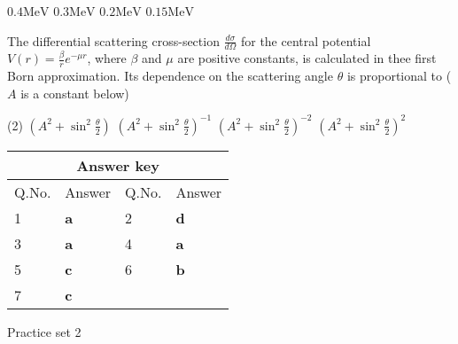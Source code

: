 \begin{enumerate}
\begin{tasks}
	\task[\textbf{A.}] $0.4 \mathrm{MeV}$
	\task[\textbf{B.}]$0.3 \mathrm{MeV}$
	\task[\textbf{C.}]$0.2 \mathrm{MeV}$
	\task[\textbf{D.}]$0.15 \mathrm{MeV}$
\end{tasks}
\begin{minipage}{\textwidth}
	\item The differential scattering cross-section $\frac{d \sigma}{d \Omega}$ for the central potential $V(r)=\frac{\beta}{r} e^{-\mu r}$, where $\beta$ and $\mu$ are positive constants, is calculated in thee first Born approximation. Its dependence on the scattering angle $\theta$ is proportional to ( $A$ is a constant below)
\end{minipage}
\begin{tasks}(2)
	\task[\textbf{A.}] $\left(A^{2}+\sin ^{2} \frac{\theta}{2}\right)$
	\task[\textbf{B.}]$\left(A^{2}+\sin ^{2} \frac{\theta}{2}\right)^{-1}$
	\task[\textbf{C.}]$\left(A^{2}+\sin ^{2} \frac{\theta}{2}\right)^{-2}$
	\task[\textbf{D.}]$\left(A^{2}+\sin ^{2} \frac{\theta}{2}\right)^{2}$
\end{tasks}
 \end{enumerate}
\setlength\arrayrulewidth{1pt}
\begin{table}[H]
	\centering
	
	\begin{tabular}{|p{1.5cm}|p{1.5cm}||p{1.5cm}|p{1.5cm}|}
		\hline
		\multicolumn{4}{|c|}{\textbf{Answer key}}\\\hline\hline
		\rowcolor{ocrel}Q.No.&Answer&Q.No.&Answer\\\hline
		1&\textbf{a}&2&\textbf{d}\\\hline
		3&\textbf{a}&4&\textbf{a}\\\hline
		5&\textbf{c}&6&\textbf{b}\\\hline
		7&\textbf{c}&&\\\hline
	\end{tabular}
\end{table}
\newpage
\begin{abox}
	Practice set 2 
	\end{abox}
